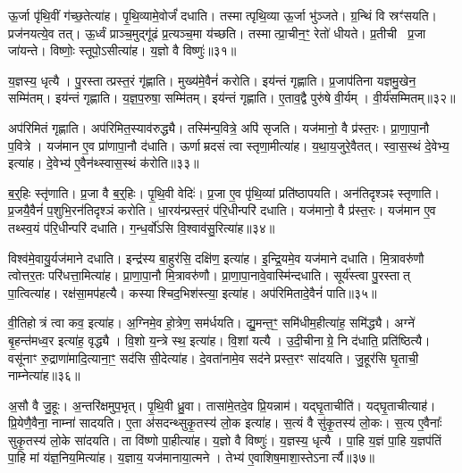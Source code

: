 ऊ॒र्जा पृ॑थि॒वीं ग॑च्छ॒तेत्या॑ह।
पृ॒थि॒व्यामे॒वोर्जं॑ दधाति।
तस्मात्पृथि॒व्या ऊ॒र्जा भु॑ञ्जते।
ग्र॒न्थिं वि स्रꣳ॑सयति।
प्रज॑नयत्ये॒व तत्।
ऊ॒र्ध्वं प्राञ्च॒मुद्गू॑ढं प्र॒त्यञ्च॒मा य॑च्छति।
तस्मात्प्रा॒चीन॒ꣳ॒ रेतो॑ धीयते।
प्र॒तीची प्र॒जा जा॑यन्ते।
विष्णोः॒ स्तूपो॒\-ऽसीत्या॑ह।
य॒ज्ञो वै विष्णुः॑॥३१॥

य॒ज्ञस्य॒ धृत्यै।
पु॒रस्तात्प्रस्त॒रं गृ॑ह्णाति।
मुख्य॑मे॒वैनं॑ करोति।
इय॑न्तं गृह्णाति।
प्र॒जाप॑तिना यज्ञमु॒खेन॒ सम्मि॑तम्।
इय॑न्तं गृह्णाति।
य॒ज्ञ॒प॒रुषा॒ सम्मि॑तम्।
इय॑न्तं गृह्णाति।
ए॒ताव॒द्वै पुरु॑षे वी॒र्यम्।
वी॒र्य॑सम्मितम्॥३२॥

अप॑रिमितं गृह्णाति।
अप॑रिमित॒स्याव॑रुद्ध्यै।
तस्मि॑न्प॒वित्रे॒ अपि॑ सृजति।
यज॑मानो॒ वै प्र॑स्त॒रः।
प्रा॒णा॒पा॒नौ प॒वित्रे।
यज॑मान ए॒व प्रा॑णापा॒नौ द॑धाति।
ऊर्णाम्रदसं त्वा स्तृणा॒मीत्या॑ह।
य॒था॒य॒जुरे॒वैतत्।
स्वा॒स॒स्थं दे॒वेभ्य॒ इत्या॑ह।
दे॒वेभ्य॑ ए॒वैन॑थ्स्वास॒स्थं क॑रोति॥३३॥

ब॒र्॒हिः स्तृ॑णाति।
प्र॒जा वै ब॒र्॒हिः।
पृ॒थि॒वी वेदिः॑।
प्र॒जा ए॒व पृ॑थि॒व्यां प्रति॑ष्ठापयति।
अन॑तिदृश्ञꣴ स्तृणाति।
प्र॒जयै॒वैनं॑ प॒शुभि॒रन॑तिदृश्ञं करोति।
धा॒रय॑न्प्रस्त॒रं प॑रि॒धीन्परि॑ दधाति।
यज॑मानो॒ वै प्र॑स्त॒रः।
यज॑मान ए॒व तथ्स्व॒यं प॑रि॒धीन्परि॑ दधाति।
ग॒न्ध॒र्वो॑ऽसि वि॒श्वाव॑सु॒रित्या॑ह॥३४॥

विश्व॑मे॒वायु॒र्यज॑माने दधाति।
इन्द्र॑स्य बा॒हुर॑सि॒ दक्षि॑ण॒ इत्या॑ह।
इ॒न्द्रि॒यमे॒व यज॑माने दधाति।
मि॒त्रावरु॑णौ त्वोत्तर॒तः परि॑धत्ता॒मित्या॑ह।
प्रा॒णा॒पा॒नौ मि॒त्रावरु॑णौ।
प्रा॒णा॒पा॒नावे॒वास्मि॑न्दधाति।
सूर्य॑स्त्वा पु॒रस्तात् पा॒त्वित्या॑ह।
रक्ष॑सा॒मप॑हत्यै।
कस्याश्चिद॒भिश॑स्त्या॒ इत्या॑ह।
अप॑रिमितादे॒वैनं॑ पाति॥३५॥

वी॒तिहोत्रं त्वा कव॒ इत्या॑ह।
अ॒ग्निमे॒व हो॒त्रेण॒ सम॑र्धयति।
द्यु॒मन्त॒ꣳ॒ समि॑धीम॒हीत्या॑ह॒ समि॑द्ध्यै।
अग्ने॑ बृ॒हन्त॑मध्व॒र इत्या॑ह॒ वृद्ध्यै।
वि॒शो य॒न्त्रे स्थ॒ इत्या॑ह।
वि॒शां यत्यै।
उ॒दी॒चीनाग्रे॒ नि द॑धाति॒ प्रति॑ष्ठित्यै।
वसू॑नाꣳ रु॒द्राणा॑मादि॒त्याना॒ꣳ॒ सद॑सि सी॒देत्या॑ह।
दे॒वता॑नामे॒व सद॑ने प्रस्त॒रꣳ सा॑दयति।
जु॒हूर॑सि घृ॒ताची॒ नाम्नेत्या॑ह॥३६॥

अ॒सौ वै जु॒हूः।
अ॒न्तरि॑क्षमुप॒भृत्।
पृ॒थि॒वी ध्रु॒वा।
तासा॑मे॒तदे॒व प्रि॒यन्नाम॑।
यद्\mbox{}घृ॒ताचीति॑।
यद्\mbox{}घृ॒ताचीत्याह॑।
प्रि॒येणै॒वैना॒ नाम्ना॑ सादयति।
ए॒ता अ॑सदन्थ्सुकृ॒तस्य॑ लो॒क इत्या॑ह।
स॒त्यं वै सु॑कृ॒तस्य॑ लो॒कः।
स॒त्य ए॒वैनाः᳚ सुकृ॒तस्य॑ लो॒के सा॑दयति।
ता वि॑ष्णो पा॒हीत्या॑ह।
य॒ज्ञो वै विष्णुः॑।
य॒ज्ञस्य॒ धृत्यै।
पा॒हि य॒ज्ञं पा॒हि य॒ज्ञप॑तिं पा॒हि मां य॑ज्ञ॒निय॒मित्या॑ह।
य॒ज्ञाय॒ यज॑मानाया॒त्मने।
तेभ्य॑ ए॒वाशिष॒माशा॒स्ते\-ऽनार्त्यै॥३७॥\anuvakamend[स्थेत्या॑ह पृथि॒वी वेदि॒र्यन्ति॑ क्रि॒यते॒ वीणु॑र्वी॒र्य॑सम्मितं करोत्याह पाति॒ नाम्नेत्या॑ह लो॒के सा॑दयति॒ षट् च॑]

